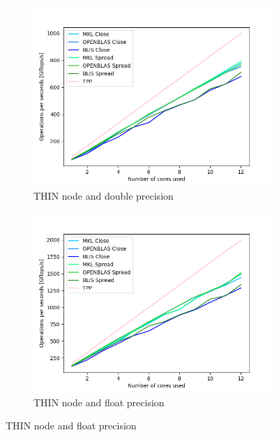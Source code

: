 \documentclass[12pt]{article}
\begin{document}
         \begin{figure}[h]
            \centering
            \begin{subfigure}[b]{0.4\textwidth}
                \includegraphics[width = \textwidth]{figs2/fixed_matrix_THIN_d.png}
                \caption{THIN node and double precision}
                \label{fig:fixed_matrix_thin_d}
            \end{subfigure}
            \begin{subfigure}[b]{0.4\textwidth}
                \includegraphics[width = \textwidth]{figs2/fixed_matrix_THIN_f.png}
                \caption{THIN node and float precision}
                \label{fig:fixed_matrix_thin_f}
            \end{subfigure}

\end{figure}
\end{document}
